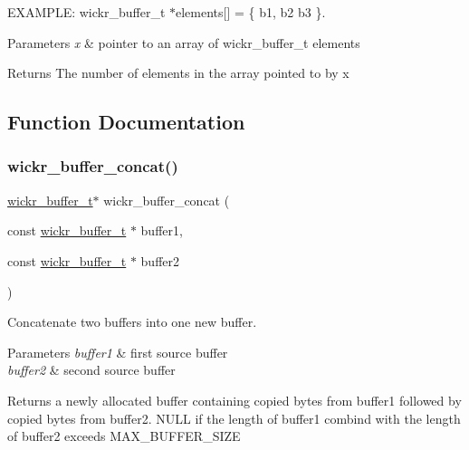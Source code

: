 E\+X\+A\+M\+P\+LE\+: wickr\+\_\+buffer\+\_\+t $\ast$elements\mbox{[}\mbox{]} = \{ b1, b2 b3 \}.


\begin{DoxyParams}{Parameters}
{\em x} & pointer to an array of wickr\+\_\+buffer\+\_\+t elements \\
\hline
\end{DoxyParams}
\begin{DoxyReturn}{Returns}
The number of elements in the array pointed to by x 
\end{DoxyReturn}


\subsection{Function Documentation}
\mbox{\label{group__wickr__buffer_gad7721c1033a1fc378a0a11613f3cfb26}} 
\subsubsection{\texorpdfstring{wickr\+\_\+buffer\+\_\+concat()}{wickr\_buffer\_concat()}}
{\footnotesize\ttfamily \mbox{\hyperlink{structwickr__buffer}{wickr\+\_\+buffer\+\_\+t}}$\ast$ wickr\+\_\+buffer\+\_\+concat (\begin{DoxyParamCaption}\item[{const \mbox{\hyperlink{structwickr__buffer}{wickr\+\_\+buffer\+\_\+t}} $\ast$}]{buffer1,  }\item[{const \mbox{\hyperlink{structwickr__buffer}{wickr\+\_\+buffer\+\_\+t}} $\ast$}]{buffer2 }\end{DoxyParamCaption})}



Concatenate two buffers into one new buffer. 


\begin{DoxyParams}{Parameters}
{\em buffer1} & first source buffer \\
\hline
{\em buffer2} & second source buffer \\
\hline
\end{DoxyParams}
\begin{DoxyReturn}{Returns}
a newly allocated buffer containing copied bytes from \textquotesingle{}buffer1\textquotesingle{} followed by copied bytes from \textquotesingle{}buffer2\textquotesingle{}. N\+U\+LL if the length of \textquotesingle{}buffer1\textquotesingle{} combind with the length of \textquotesingle{}buffer2\textquotesingle{} exceeds M\+A\+X\+\_\+\+B\+U\+F\+F\+E\+R\+\_\+\+S\+I\+ZE 
\end{DoxyReturn}
\mbox{\label{group__wickr__buffer_ga3aa7ea751a65310184d6c0ea9627dca8}} 
